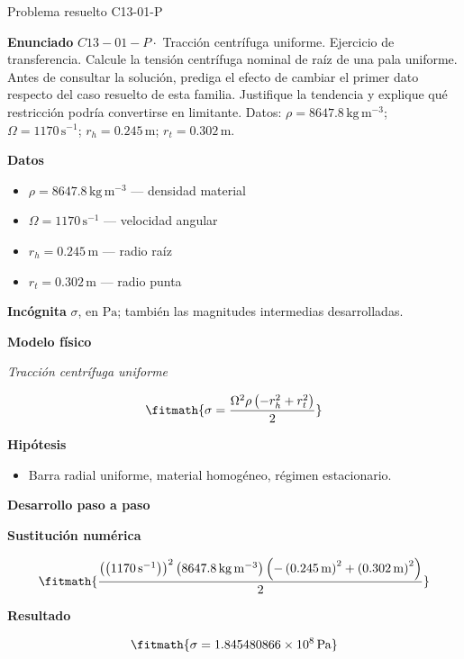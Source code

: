 \documentclass[10pt,openany]{book}
\begin{document}
\begin{studiumworked}{Problema resuelto C13-01-P}


\noindent\textbf{Enunciado}
\(C13-01-P \cdot\) Tracción centrífuga uniforme. Ejercicio de transferencia. Calcule la tensión centrífuga nominal de raíz de una pala uniforme. Antes de consultar la solución, prediga el efecto de cambiar el primer dato respecto del caso resuelto de esta familia. Justifique la tendencia y explique qué restricción podría convertirse en limitante. Datos: \(\rho=8647.8\, \mathrm{kg}\,\mathrm{m}^{-3}\); \(\Omega=1170\, \mathrm{s}^{-1}\); \(r_h=0.245\, \mathrm{m}\); \(r_t=0.302\, \mathrm{m}\).

\noindent\textbf{Datos}
\begin{itemize}
\item $\rho = 8647.8\,\mathrm{kg}\,\mathrm{m}^{-3}$ — densidad material
\item $\Omega = 1170\,\mathrm{s}^{-1}$ — velocidad angular
\item $r_h = 0.245\,\mathrm{m}$ — radio raíz
\item $r_t = 0.302\,\mathrm{m}$ — radio punta
\end{itemize}

\noindent\textbf{Incógnita}
$\sigma$, en $\mathrm{Pa}$; también las magnitudes intermedias desarrolladas.

\noindent\textbf{Modelo físico}

\noindent\textit{Tracción centrífuga uniforme}

\[
\fitmath{\sigma=\frac{\Omega^{2} \rho \left(- r_h^{2} + r_t^{2}\right)}{2}}
\]

\noindent\textbf{Hipótesis}
\begin{itemize}
\item Barra radial uniforme, material homogéneo, régimen estacionario.
\end{itemize}

\noindent\textbf{Desarrollo paso a paso}



\noindent\textbf{Sustitución numérica}

\[
\fitmath{\frac{\left(\left(1170\,\mathrm{s}^{-1}\right)\right)^{2} \left(8647.8\,\mathrm{kg}\,\mathrm{m}^{-3}\right) \left(- \left(0.245\,\mathrm{m}\right)^{2} + \left(0.302\,\mathrm{m}\right)^{2}\right)}{2}}
\]

\noindent\textbf{Resultado}

\[
\fitmath{\sigma=1.845480866\times10^{8}\,\mathrm{Pa}}
\]


\end{studiumworked}
\end{document}
